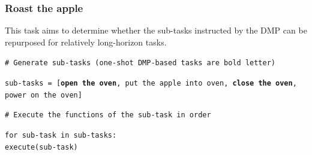\documentclass[letterpaper,conference]{ieeeconf}
\begin{document}
\subsubsection{Roast the apple}
This task aims to determine whether the sub-tasks instructed by the DMP can be repurposed for relatively long-horizon tasks. 
\begin{codebox}
\textcolor{codegreen}{\footnotesize \texttt{\# Generate sub-tasks (one-shot DMP-based tasks are bold letter)}}\vspace*{1mm}\\
\colorbox{codeblue}{%
    \begin{minipage}{\dimexpr\textwidth-6pt\relax}
        \footnotesize \texttt{sub-tasks = [\textbf{\textquotesingle open the oven\textquotesingle }, \textquotesingle put the apple into oven\textquotesingle , \textbf{\textquotesingle close the oven\textquotesingle }, \textquotesingle power on the oven\textquotesingle ]}
    \end{minipage}%
}
\textcolor{codegreen}{\footnotesize \texttt{\# Execute the functions of the sub-task in order}\vspace{1mm}}\\
\colorbox{longhri}{%
    \begin{minipage}{\dimexpr\textwidth-6pt\relax}
        \footnotesize \texttt{for sub-task in sub-tasks:\\
            \hspace*{0.5cm}execute(sub-task)}
    \end{minipage}%
}
\end{codebox}
\vspace{-1.5mm}
\end{document}
